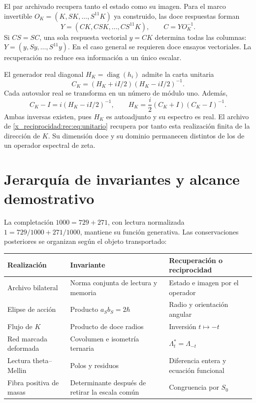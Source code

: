 El par archivado recupera tanto el estado como su imagen. Para el marco invertible \(O_K=(K,SK,\ldots,S^{11}K)\) ya construido, las doce respuestas forman
\[
 Y=(CK,CSK,\ldots,CS^{11}K),\qquad C=YO_K^{-1}.
\]
Si \(CS=SC\), una sola respuesta vectorial \(y=CK\) determina todas las columnas: \(Y=(y,Sy,\ldots,S^{11}y)\). En el caso general se requieren doce ensayos vectoriales. La recuperación no reduce esa información a un único escalar.

El generador real diagonal \(H_K=\operatorname{diag}(h_i)\) admite la carta unitaria
\[
 C_K=(H_K+iI/2)(H_K-iI/2)^{-1}.
\]
Cada autovalor real se transforma en un número de módulo uno. Además,
\[
 C_K-I=i(H_K-iI/2)^{-1},\qquad
 H_K=\frac i2(C_K+I)(C_K-I)^{-1}.
\]
Ambas inversas existen, pues \(H_K\) es autoadjunto y su espectro es real. El archivo de \eqref{x_reciprocidad:rec:eq:unitario} recupera por tanto esta realización finita de la dirección de \(K\). Su dimensión doce y su dominio permanecen distintos de los de un operador espectral de zeta.

\section{Jerarquía de invariantes y alcance demostrativo}

La completación \(1000=729+271\), con lectura normalizada \(1=729/1000+271/1000\), mantiene su función generativa. Las conservaciones posteriores se organizan según el objeto transportado:
\begin{center}
\small
\begin{tabularx}{\linewidth}{@{}p{.27\linewidth}Xp{.25\linewidth}@{}}
\toprule
Realización & Invariante & Recuperación o reciprocidad\\
\midrule
Archivo bilateral & Norma conjunta de lectura y memoria & Estado e imagen por el operador\\
Elipse de acción & Producto \(a_Sb_S=2\hbar\) & Radio y orientación angular\\
Flujo de \(K\) & Producto de doce radios & Inversión \(t\mapsto-t\)\\
Red marcada deformada & Covolumen e isometría ternaria & \(\Lambda_t^*=\Lambda_{-t}\)\\
Lectura theta--Mellin & Polos y residuos & Diferencia entera y ecuación funcional\\
Fibra positiva de masas & Determinante después de retirar la escala común & Congruencia por \(S_0\)\\
\bottomrule
\end{tabularx}
\end{center}


